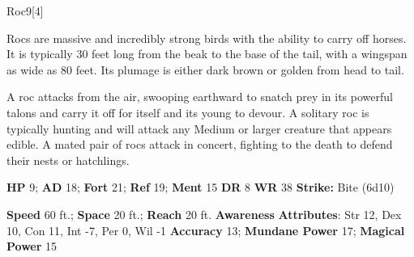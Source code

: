   
  \begin{monsection}{Roc}{9}[4]
    \vspace{-1em}\vspace{-1em}
    \vspace{0em}

    
      Rocs are massive and incredibly strong birds with the ability to carry off horses.
      It is typically 30 feet long from the beak to the base of the tail, with a wingspan as wide as 80 feet.
      Its plumage is either dark brown or golden from head to tail.

      A roc attacks from the air, swooping earthward to snatch prey in its powerful talons and carry it off for itself and its young to devour.
      A solitary roc is typically hunting and will attack any Medium or larger creature that appears edible.
      A mated pair of rocs attack in concert, fighting to the death to defend their nests or hatchlings.
    

    \begin{spellcontent}
      \begin{spelltargetinginfo}
        \pari \textbf{HP} 9;
          \textbf{AD} 18;
          \textbf{Fort} 21;
          \textbf{Ref} 19;
          \textbf{Ment} 15
        \pari \textbf{DR} 8
        \pari \textbf{WR} 38
        \pari \textbf{Strike:}
            Bite  (6d10)
      \end{spelltargetinginfo}
    \end{spellcontent}
    \begin{monsterfooter}
      \pari \textbf{Speed} 60 ft.;
        \textbf{Space} 20 ft.;
        \textbf{Reach} 20 ft.
      \pari \textbf{Awareness} 
      \pari \textbf{Attributes}:
        Str 12, Dex 10,
        Con 11, Int -7,
        Per 0, Wil -1
      \pari \textbf{Accuracy} 13;
        \textbf{Mundane Power} 17;
      \textbf{Magical Power} 15
    \end{monsterfooter}
  \end{monsection}
  
